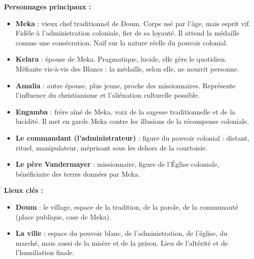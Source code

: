 \documentclass[11pt]{article}
\begin{document}
\begin{exemplebox}
\textbf{Personnages principaux :}
\begin{itemize}
    \item \textbf{Meka} : vieux chef traditionnel de Doum. Corps usé par l'âge, mais esprit vif. Fidèle à l'administration coloniale, fier de sa loyauté. Il attend la médaille comme une consécration. Naïf sur la nature réelle du pouvoir colonial.
    \item \textbf{Kelara} : épouse de Meka. Pragmatique, lucide, elle gère le quotidien. Méfiante vis-à-vis des Blancs : la médaille, selon elle, ne nourrit personne.
    \item \textbf{Amalia} : autre épouse, plus jeune, proche des missionnaires. Représente l'influence du christianisme et l'aliénation culturelle possible.
    \item \textbf{Engamba} : frère aîné de Meka, voix de la sagesse traditionnelle et de la lucidité. Il met en garde Meka contre les illusions de la récompense coloniale.
    \item \textbf{Le commandant (l'administrateur)} : figure du pouvoir colonial : distant, rituel, manipulateur, méprisant sous les dehors de la courtoisie.
    \item \textbf{Le père Vandermayer} : missionnaire, figure de l'Église coloniale, bénéficiaire des terres données par Meka.
\end{itemize}

\textbf{Lieux clés :}
\begin{itemize}
    \item \textbf{Doum} : le village, espace de la tradition, de la parole, de la communauté (place publique, case de Meka).
    \item \textbf{La ville} : espace du pouvoir blanc, de l'administration, de l'église, du marché, mais aussi de la misère et de la prison. Lieu de l'altérité et de l'humiliation finale.
\end{itemize}


\end{exemplebox}
\end{document}

